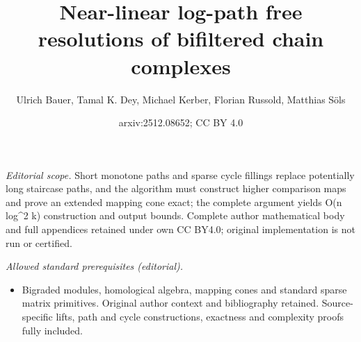 \documentclass[11pt]{article}
\title{Near-linear log-path free resolutions of bifiltered chain complexes}
\author{Ulrich Bauer, Tamal K. Dey, Michael Kerber, Florian Russold, Matthias Söls}
\date{arxiv:2512.08652; CC BY 4.0}
\begin{document}
\maketitle
\noindent\textit{Editorial scope.} Short monotone paths and sparse cycle fillings replace potentially long staircase paths, and the algorithm must construct higher comparison maps and prove an extended mapping cone exact; the complete argument yields O(n log\textasciicircum{}2 k) construction and output bounds. Complete author mathematical body and full appendices retained under own CC BY4.0; original implementation is not run or certified.\par\medskip
\noindent\textit{Allowed standard prerequisites (editorial).}\begin{itemize}
\item Bigraded modules, homological algebra, mapping cones and standard sparse matrix primitives. Original author context and bibliography retained. Source-specific lifts, path and cycle constructions, exactness and complexity proofs fully included.
\end{itemize}\medskip
\end{document}
